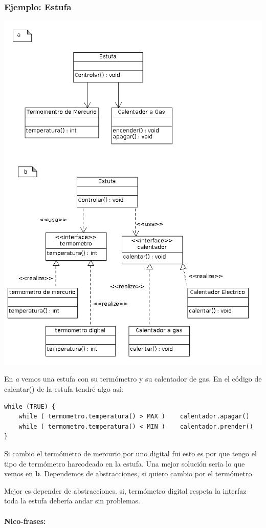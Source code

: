\documentclass[10pt,a4paper]{article}
\begin{document}
\subsubsection{Ejemplo: Estufa }
\includegraphics[scale=0.5]{./img/estufa.png} 

En \textit{a} vemos una estufa con su termómetro y su calentador de gas. En el código de calentar() de la estufa tendré algo así:
\begin{verbatim}
while (TRUE) {
    while ( termometro.temperatura() > MAX ) 	calentador.apagar()
    while ( termometro.temperatura() < MIN )	calentador.prender()
}
\end{verbatim} 

Si cambio el termómetro de mercurio por uno digital fui
esto es por que tengo el tipo de termómetro harcodeado en la estufa.
Una mejor solución seria lo que vemos en\textbf{ b}. Dependemos de abstracciones, 
si quiero cambio por el termómetro.

Mejor es depender de abstracciones. si, termómetro digital respeta
la interfaz toda la estufa debería andar sin problemas.
\\
\\
\textbf{ Nico-frases:}
\end{document}
